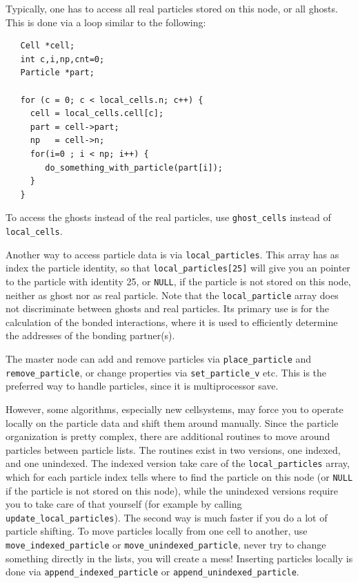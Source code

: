 \documentclass[
a4paper,                        %
11pt,                           %
twoside,                        %
footsepline,                    %
headsepline,                    %
headexclude,                    %
footexclude,                    %
pagesize,                       %
bibtotocnumbered,               %
idxtotoc                        %
]{scrreprt}
\begin{document}
Typically, one has to access all real particles stored on this node,
or all ghosts. This is done via a loop similar to the following:
\begin{verbatim}
   Cell *cell;
   int c,i,np,cnt=0;
   Particle *part;
 
   for (c = 0; c < local_cells.n; c++) {
     cell = local_cells.cell[c];
     part = cell->part;
     np   = cell->n;
     for(i=0 ; i < np; i++) {
        do_something_with_particle(part[i]);
     }
   }
\end{verbatim}

To access the ghosts instead of the real particles, use
\verb!ghost_cells! instead of \verb!local_cells!.

Another way to access particle data is via
\verb!local_particles!. This array has as index the particle identity,
so that \verb!local_particles[25]!  will give you an pointer to the
particle with identity 25, or \verb!NULL!, if the particle is not
stored on this node, neither as ghost nor as real particle. Note that
the \verb!local_particle! array does not discriminate between ghosts
and real particles. Its primary use is for the calculation of the
bonded interactions, where it is used to efficiently determine the
addresses of the bonding partner(s).

The master node can add and remove particles via \verb!place_particle!
and \verb!remove_particle!, or change properties via
\verb!set_particle_v!  etc. This is the preferred way to handle
particles, since it is multiprocessor save.

However, some algorithms, especially new cellsystems, may force you to
operate locally on the particle data and shift them around manually.
Since the particle organization is pretty complex, there are
additional routines to move around particles between particle
lists. The routines exist in two versions, one indexed, and one
unindexed. The indexed version take care of the \verb!local_particles!
array, which for each particle index tells where to find the particle
on this node (or \verb!NULL! if the particle is not stored on this
node), while the unindexed versions require you to take care of that
yourself (for example by calling \verb!update_local_particles!). The
second way is much faster if you do a lot of particle shifting. To
move particles locally from one cell to another, use
\verb!move_indexed_particle! or \verb!move_unindexed_particle!, never
try to change something directly in the lists, you will create a mess!
Inserting particles locally is done via \verb!append_indexed_particle!
or \verb!append_unindexed_particle!.
\end{document}
